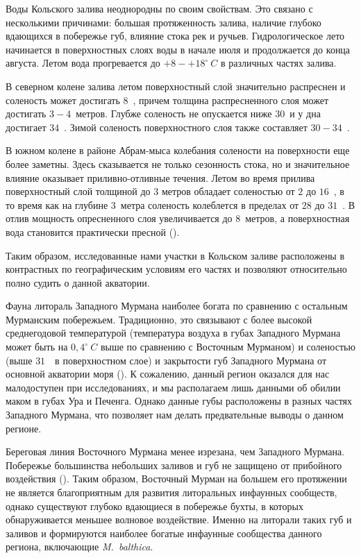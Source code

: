 Воды Кольского залива неоднородны по своим свойствам. 
Это связано с несколькими причинами: большая протяженность залива, наличие глубоко вдающихся в побережье губ, влияние стока рек и ручьев. 
Гидрологическое лето начинается в поверхностных слоях воды в начале июля и продолжается до конца августа. 
Летом вода прогревается до $+ 8 - +18^{\circ}\ C$ в различных частях залива.

В  северном колене залива летом поверхностный слой значительно распреснен и соленость может достигать $8$~\permil, причем толщина распресненного слоя может достигать $3-4$~метров. 
Глубже соленость не опускается ниже $30$~\permil и у дна достигает $34$~\permil. 
Зимой соленость поверхностного слоя также составляет $30 - 34$~\permil. 

В южном колене в районе Абрам-мыса колебания солености на поверхности еще более заметны. 
Здесь сказывается не только сезонность стока, но и значительное влияние оказывает приливно-отливные течения. 
Летом во время прилива поверхностный слой толщиной до 3 метров обладает соленостью от $2$ до $16$~\permil, в то время как на глубине $3$~метра соленость колеблется в пределах от $28$ до $31$~\permil. 
В отлив мощность опресненного слоя увеличивается до $8$~метров, а поверхностная вода становится практически пресной (\cite{Derugin_1915}).

Таким образом, исследованные нами участки в Кольском заливе расположены в контрастных по географическим условиям его частях и позволяют относительно полно судить о данной акватории.

Фауна литораль Западного Мурмана наиболее богата по сравнению с остальным Мурманским побережьем. 
Традиционно, это связывают с более высокой среднегодовой температурой (температура воздуха в губах Западного Мурмана может быть на $0,4^{\circ}\ C$ выше по сравнению с Восточным Мурманом) и соленостью (выше $31$~\permil\ в поверхностном слое) и закрытости губ Западного Мурмана от основной акватории моря (\cite{Guryanova_et_al_1930}). 
К сожалению, данный регион оказался для нас малодоступен при исследованиях, и мы располагаем лишь данными об обилии маком в губах Ура и Печенга.
Однако данные губы расположены в разных частях Западного Мурмана, что позволяет нам делать предвательные выводы о данном регионе.

Береговая линия Восточного Мурмана менее изрезана, чем Западного Мурмана. 
Побережье большинства небольших заливов и губ не защищено от прибойного воздействия (\cite{Guryanova_Ushakov_1929}).
Таким образом, Восточный Мурман на большем его протяжении не является благоприятным для развития литоральных инфаунных сообществ, однако существуют глубоко вдающиеся в побережье бухты, в которых обнаруживается меньшее волновое воздействие. 
Именно на литорали таких губ и заливов и формируются наиболее богатые инфаунные сообщества данного региона, включающие {\it M.~balthica}.

